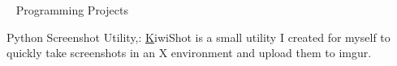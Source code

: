 

\begin{cventries}

%
	\cventry
	{~}
	{Programming Projects}
	{}
	{}
	{
		\begin{cvitems}
		\item {Python Screenshot Utility,: \href{https://github.com/AJubatus/Kiwishot}
			KiwiShot is a small utility I created for myself to quickly take screenshots in an X environment and upload them to imgur.}
		\end{cvitems}
		}


\end{cventries}
